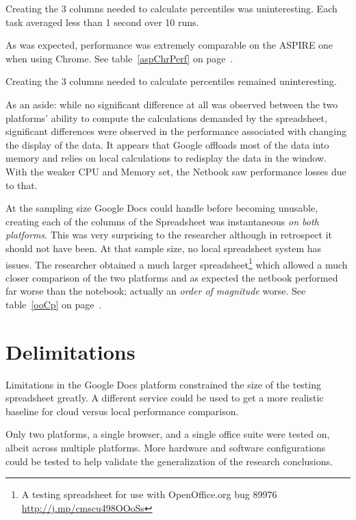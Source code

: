 Creating the 3 columns needed to calculate percentiles was uninteresting.  Each
task averaged less than 1 second over 10 runs.

As was expected, performance was extremely comparable on the ASPIRE one when
using Chrome. See table~\ref{aspChrPerf} on page~\pageref{aspChrPerf}.



Creating the 3 columns needed to calculate percentiles remained uninteresting.

As an aside: while no significant difference at all was observed between the
two platforms' ability to compute the calculations demanded by the spreadsheet,
significant differences were observed in the performance associated with
changing the display of the data.  It appears that Google offloads most of the
data into memory and relies on local calculations to redisplay the data in the
window.  With the weaker CPU and Memory set, the Netbook saw performance losses
due to that.

At the sampling size Google Docs could handle before becoming unusable, creating
each of the columns of the Spreadsheet was instantaneous \emph{on both
  platforms}.  This was very surprising to the researcher although in retrospect
it should not have been.  At that sample size, no local spreadsheet system has
issues.  The researcher obtained a much larger spreadsheet\footnote{A testing
  spreadsheet for use with OpenOffice.org bug 89976
  \url{http://j.mp/cmscu498OOoSs}} which allowed a much closer comparison of the
two platforms and as expected the netbook performed far worse than the notebook;
actually an \emph{order of magnitude} worse. See table~\ref{ooCp} on
page~\pageref{ooCp}.



\section{Delimitations}


Limitations in the Google Docs platform constrained the size of the testing
spreadsheet greatly.  A different service could be used to get a more realistic
baseline for cloud versus local performance comparison.

Only two platforms, a single browser, and a single office suite were tested on,
albeit across multiple platforms.  More hardware and software configurations
could be tested to help validate the generalization of the research conclusions.

